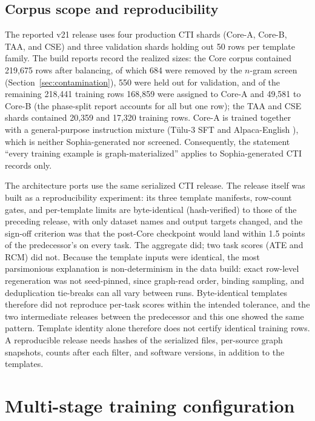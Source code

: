 \documentclass[twocolumn]{svjour3}
\begin{document}
\subsection{Corpus scope and reproducibility}\label{sec:corpus}
The reported v21 release uses four production CTI shards (Core-A, Core-B, TAA, and CSE) and three validation shards holding out 50 rows per template family. The build reports record the realized sizes: the Core corpus contained 219,675 rows after balancing, of which 684 were removed by the $n$-gram screen (Section~\ref{sec:contamination}), 550 were held out for validation, and of the remaining 218,441 training rows 168,859 were assigned to Core-A and 49,581 to Core-B (the phase-split report accounts for all but one row); the TAA and CSE shards contained 20,359 and 17,320 training rows. Core-A is trained together with a general-purpose instruction mixture (T\"ulu-3 SFT and Alpaca-English \cite{lambert2024tulu3,taori2023alpaca}), which is neither Sophia-generated nor screened. Consequently, the statement ``every training example is graph-materialized'' applies to Sophia-generated CTI records only.

The architecture ports use the same serialized CTI release. The release itself was built as a reproducibility experiment: its three template manifests, row-count gates, and per-template limits are byte-identical (hash-verified) to those of the preceding release, with only dataset names and output targets changed, and the sign-off criterion was that the post-Core checkpoint would land within 1.5 points of the predecessor's on every task. The aggregate did; two task scores (ATE and RCM) did not. Because the template inputs were identical, the most parsimonious explanation is non-determinism in the data build: exact row-level regeneration was not seed-pinned, since graph-read order, binding sampling, and deduplication tie-breaks can all vary between runs. Byte-identical templates therefore did not reproduce per-task scores within the intended tolerance, and the two intermediate releases between the predecessor and this one showed the same pattern. Template identity alone therefore does not certify identical training rows. A reproducible release needs hashes of the serialized files, per-source graph snapshots, counts after each filter, and software versions, in addition to the templates.

\section{Multi-stage training configuration}\label{sec:training}
\end{document}
